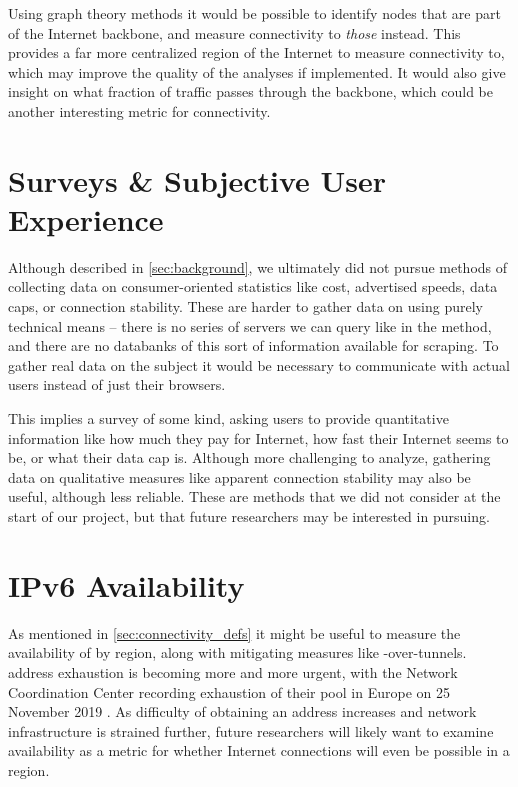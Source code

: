 Using graph theory methods it would be possible to identify nodes that are part of the Internet backbone, and measure connectivity to \textit{those} instead. This provides a far more centralized region of the Internet to measure connectivity to, which may improve the quality of the analyses if implemented. It would also give insight on what fraction of traffic passes through the backbone, which could be another interesting metric for connectivity.

\section{Surveys \& Subjective User Experience}

Although described in \cref{sec:background}, we ultimately did not pursue methods of collecting data on consumer-oriented statistics like cost, advertised speeds, data caps, or connection stability. These are harder to gather data on using purely technical means -- there is no series of servers we can query like in the \dns method, and there are no databanks of this sort of information available for scraping. To gather real data on the subject it would be necessary to communicate with actual users instead of just their browsers.

This implies a survey of some kind, asking users to provide quantitative information like how much they pay for Internet, how fast their Internet seems to be, or what their data cap is. Although more challenging to analyze, gathering data on qualitative measures like apparent connection stability may also be useful, although less reliable. These are methods that we did not consider at the start of our project, but that future researchers may be interested in pursuing.

\section{IPv6 Availability}

As mentioned in \cref{sec:connectivity_defs} it might be useful to measure the availability of \ipvs by region, along with mitigating measures like \ipvs-over-\ipvf tunnels. \ipvf address exhaustion is becoming more and more urgent, with the \ripe Network Coordination Center recording exhaustion of their pool in Europe on 25 November 2019 \cite{ReseauxIPEuropeensNetworkCoordinationCentre2019a}. As difficulty of obtaining an \ipvf address increases and network infrastructure is strained further, future researchers will likely want to examine \ipvs availability as a metric for whether Internet connections will even be possible in a region.
